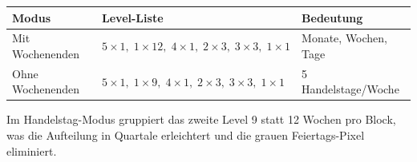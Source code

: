 \documentclass[11pt,a4paper]{article}
\begin{document}
\begin{center}
\begin{tabular}{lll}
\toprule
Modus & Level-Liste & Bedeutung \\
\midrule
Mit Wochenenden    & $5\times1,\;1\times12,\;4\times1,\;2\times3,\;3\times3,\;1\times1$ & Monate, Wochen, Tage \\
Ohne Wochenenden   & $5\times1,\;1\times9,\;4\times1,\;2\times3,\;3\times3,\;1\times1$  & 5 Handelstage/Woche \\
\bottomrule
\end{tabular}
\end{center}

Im Handelstag-Modus gruppiert das zweite Level 9 statt 12 Wochen pro Block,
was die Aufteilung in Quartale erleichtert und die grauen Feiertags-Pixel
eliminiert.
\end{document}
